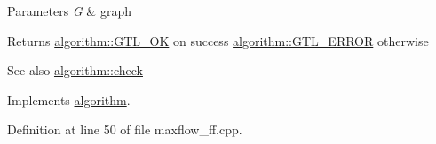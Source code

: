 \begin{DoxyParams}{Parameters}
{\em G} & graph \\
\hline
\end{DoxyParams}
\begin{DoxyReturn}{Returns}
{\ttfamily \mbox{\hyperlink{classalgorithm_af1a0078e153aa99c24f9bdf0d97f6710a5114c20e4a96a76b5de9f28bf15e282b}{algorithm\+::\+G\+T\+L\+\_\+\+OK}}} on success {\ttfamily \mbox{\hyperlink{classalgorithm_af1a0078e153aa99c24f9bdf0d97f6710a6fcf574690bbd6cf710837a169510dd7}{algorithm\+::\+G\+T\+L\+\_\+\+E\+R\+R\+OR}}} otherwise 
\end{DoxyReturn}
\begin{DoxySeeAlso}{See also}
\mbox{\hyperlink{classalgorithm_a76361fb03ad1cf643affc51821e43bed}{algorithm\+::check}} 
\end{DoxySeeAlso}


Implements \mbox{\hyperlink{classalgorithm_a76361fb03ad1cf643affc51821e43bed}{algorithm}}.



Definition at line 50 of file maxflow\+\_\+ff.\+cpp.



